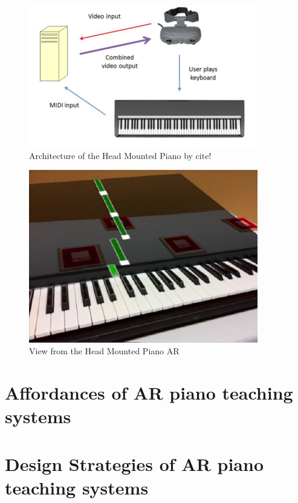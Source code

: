 \documentclass{article}
\begin{document}
\begin{figure}
    \centering
    \includegraphics[width=10cm]{figures/headmountedpiano1.png}
    \caption{Architecture of the Head Mounted Piano by cite! }
    \label{fig:pianoheadmountedarch}
\end{figure}

\begin{figure}
    \centering
    \includegraphics[width=10cm]{figures/headmountedview.png}
    \caption{View from the Head Mounted Piano AR  }
    \label{fig:View from the HeadMounted}
\end{figure}


\section{Affordances of AR piano teaching systems}


\section{Design Strategies of AR piano teaching systems}
\end{document}
